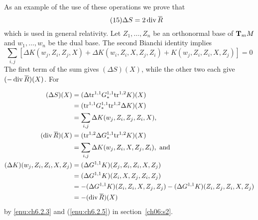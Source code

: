 \documentclass[../main]{subfiles}
\begin{document}
As an example of the use of these operations we prove that 
\begin{equation}\tag{15}
\label{eqn:ch07.15}
\Delta S = 2 \Div \xoverline R
\end{equation}
which is used in general relativity. Let $Z_1, \ldots, Z_n$ be an orthonormal base of $\tangentspace M m$ and $w_1, \ldots, w_n$ be the dual base. The second Bianchi identity implies
\[
    \sum_{i, j} [\Delta K(w_j, Z_i, Z_j, X) + \Delta K(w_i, Z_i, X, Z_j, Z_i) + K(w_j, Z_i, Z_i, X,Z_j)]=0
\]
The first term of the sum gives $(\Delta S)(X)$, while the other two each give $(-\Div \xoverline R)(X)$. For

\begin{align*}
(\Delta S)(X) & = (\Delta \tr^{1, 1} G_\ast^{1, 1} \tr^{1, 2} K)(X) \\ & = (\tr^{1, 1}G_\ast^{1, 1} \tr^{1, 2} \Delta K)(X) \\ & = \sum_{i, j} \Delta K(w_j, Z_i, Z_j, Z_i, X),
\\
(\Div \xoverline R)(X) & = (\tr^{1, 2} \Delta G_\ast^{1, 1} \tr^{1, 2}K)(X) \\ & = \sum_{i, j} \Delta K(w_j, Z_i, X, Z_j, Z_i), \text { and}
\\
(\Delta K)(w_j, Z_i, Z_i, X, Z_j) & = (\Delta G^{1, 1} K)(Z_j, Z_i, Z_i, X, Z_j) \\ & = (\Delta G^{1, 1} K)(Z_i, X, Z_j, Z_i, Z_j) \\ & = -(\Delta G^{1, 1} K)(Z_i, Z_i, X, Z_j, Z_j) - (\Delta G^{1, 1} K)(Z_i, Z_j, Z_i, X, Z_j) \\ & = -(\Div \xoverline R)(X)
\end{align*}
by \ref{enu:ch6.2.3} and (\ref{enu:ch6.2.5}) in section~\ref{ch06:s2}.
\end{document}
